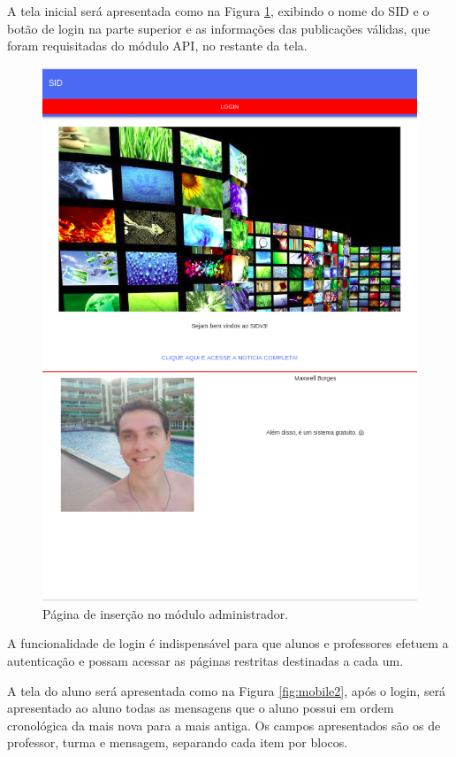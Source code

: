 A tela inicial será apresentada como na Figura \ref{fig:mobile1}, exibindo o nome do SID e o botão de login na parte superior e as informações das publicações válidas, que foram requisitadas do módulo API, no restante da tela.
\begin{figure}[H]
\centering
\includegraphics[scale=0.5]{figuras/mobile1}
\caption{Página de inserção no módulo administrador.}
\label{fig:mobile1}
\end{figure}

A funcionalidade de login é indispensável para que alunos e professores efetuem a autenticação e possam acessar as páginas restritas destinadas a cada um.

A tela do aluno será apresentada como na Figura \ref{fig:mobile2}, após o login, será apresentado ao aluno todas as mensagens que o aluno possui em ordem cronológica da mais nova para a mais antiga. Os campos apresentados são os de professor, turma e mensagem, separando cada item por blocos.

